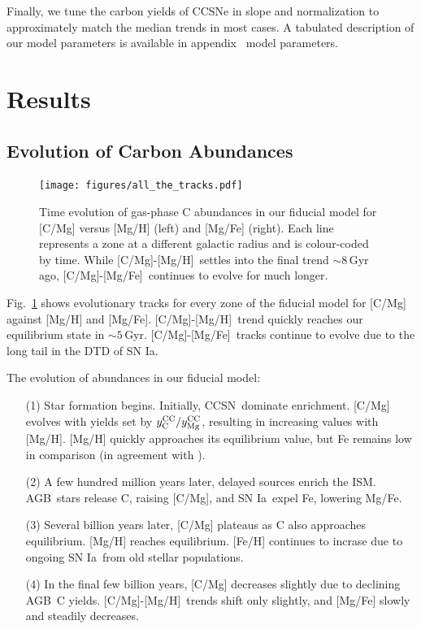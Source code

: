 \documentclass[fleqn,
usenatbib]{mnras}
\newcommand{\agb}{AGB}
\newcommand{\cc}{CCSN}
\newcommand{\ia}{SN Ia}
\newcommand{\caah}{[C/Mg]-[Mg/H]}
\newcommand{\caafe}{[C/Mg]-[Mg/Fe]}
\newcommand{\Ycc}{{y_{\rm C}^{\rm CC}}}
\newcommand{\Yoc}{{y_{\rm Mg}^{\rm CC}}}
\newcommand{\about}[1]{${\sim} #1$}
\newcommand{\dbadd}[1]{{\color{Thistle} #1}}
\begin{document}
Finally, we tune the carbon yields of CCSNe in slope and normalization to approximately match the median trends in most cases.
A tabulated description of our model parameters is available in appendix~\dbadd{model parameters}.

\section{Results}\label{sec:results}

\subsection{Evolution of Carbon Abundances}


\begin{figure}
\centering
\texttt{[image: figures/all\_the\_tracks.pdf]}
\caption[]{
    Time evolution of gas-phase C abundances in our fiducial model for [C/Mg] versus [Mg/H] (left) and [Mg/Fe] (right).
    Each line represents a zone at a different galactic radius and is colour-coded by time. While \caah\ settles into the final trend $\sim{8}$\,Gyr ago, \caafe\ continues to evolve for much longer.
}
\label{fig:c_evo}
\end{figure}



Fig.~\ref{fig:c_evo} shows evolutionary tracks for every zone of the fiducial model for [C/Mg] against [Mg/H] and [Mg/Fe].
\caah\ trend quickly reaches our equilibrium state in \about{5}\,Gyr. \caafe\ tracks continue to evolve due to the long tail in the DTD of \ia. 


The evolution of abundances in our fiducial model:
\begin{enumerate}
    \item[(1)] Star formation begins. Initially, \cc\ dominate enrichment. [C/Mg] evolves with yields set by $\Ycc/\Yoc$, resulting in increasing values with [Mg/H].  [Mg/H] quickly approaches its equilibrium value, but Fe remains low in comparison (in agreement with \citealt{WAF17}).
    \item[(2)]  A few hundred million years later,  delayed sources  enrich the ISM. \agb\ stars release C, raising [C/Mg], and \ia\ expel Fe, lowering Mg/Fe. 
    \item[(3)] Several billion years later, [C/Mg] plateaus as C also approaches equilibrium. [Mg/H] reaches equilibrium. [Fe/H] continues to incrase due to ongoing \ia\ from old stellar populations.
    \item[(4)] In the final few billion years, [C/Mg] decreases slightly due to declining \agb\ C yields. \caah\ trends shift only slightly, and [Mg/Fe] slowly and steadily decreases.

\end{enumerate}
\end{document}
